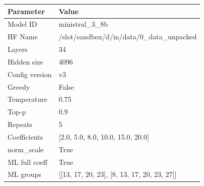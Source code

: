 \begin{tabular}{ll}
\toprule
Parameter & Value \\
\midrule
Model ID & ministral_3_8b \\
HF Name & /slot/sandbox/d/in/data/0_data_unpacked \\
Layers & 34 \\
Hidden size & 4096 \\
Config version & v3 \\
Greedy & False \\
Temperature & 0.75 \\
Top-p & 0.9 \\
Repeats & 5 \\
Coefficients & [2.0, 5.0, 8.0, 10.0, 15.0, 20.0] \\
norm\_scale & True \\
ML full coeff & True \\
ML groups & [[13, 17, 20, 23], [8, 13, 17, 20, 23, 27]] \\
\bottomrule
\end{tabular}
